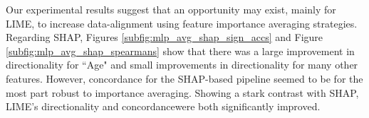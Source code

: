 \documentclass[mnsc,blindrev]{informs3}
\begin{document}
            Our experimental results suggest that an opportunity may exist, mainly for LIME, to increase data-alignment using feature importance averaging strategies.%
             Regarding SHAP, Figures \ref{subfig:mlp_avg_shap_sign_accs} and Figure \ref{subfig:mlp_avg_shap_spearmans} show that there was a large improvement in directionality for ``Age" and small improvements in directionality for many other features. However, concordance for the SHAP-based pipeline seemed to be for the most part robust to importance averaging. Showing a stark contrast with SHAP, LIME's directionality and concordancewere both significantly improved. %
            
            
\end{document}
